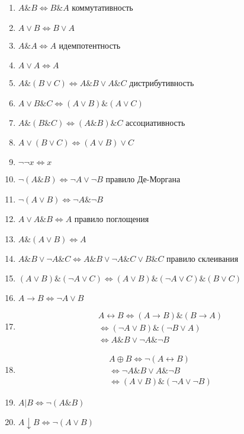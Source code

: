\documentclass[main]{subfiles}
\begin{document}
\begin{enumerate}
    \item $A\& B \Leftrightarrow B\& A$ коммутативность
    \item $A\lor B \Leftrightarrow B\lor A$
    \item $A\& A \Leftrightarrow A$ идемпотентность
    \item $A\lor A \Leftrightarrow  A$
    \item $A\&(B\lor C) \Leftrightarrow  A\& B \lor A\& C$ дистрибутивность
    \item $A\lor B\& C  \Leftrightarrow (A\lor B)\& (A\lor C)$
    \item $A\& (B\&C) \Leftrightarrow (A\& B)\&C$ ассоциативность 
    \item $A\lor (B\lor C) \Leftrightarrow  (A\lor B)\lor C$
    \item $\lnot\lnot x \Leftrightarrow x$
    \item $\lnot(A\&B) \Leftrightarrow \lnot A \lor \lnot B$ правило Де-Моргана
    \item $\lnot(A\lor B) \Leftrightarrow  \lnot A \& \lnot B$
    \item $A\lor A \& B \Leftrightarrow  A$ правило поглощения 
    \item $A\&(A\lor B) \Leftrightarrow  A$
    \item $A\& B \lor \lnot A\& C \Leftrightarrow  A\& B \lor \lnot A \& C \lor B\& C $ правило склеивания
    \item $(A\lor B) \& (\lnot A \lor C) \Leftrightarrow  (A\lor B) \& (\lnot A \lor C) \& (B\lor C)$
    \item $A\to B \Leftrightarrow \lnot A \lor B$
    \item 
        \begin{align*}
        A\leftrightarrow B \Leftrightarrow (A\to B) \& (B\to A)\\
        \Leftrightarrow (\lnot A\lor B) \& (\lnot B \lor A)\\
        \Leftrightarrow A\& B \lor \lnot A \& \lnot B
        \end{align*}
    \item 
        \begin{align*}
            A\oplus B \Leftrightarrow  \lnot(A\leftrightarrow B) \\
            \Leftrightarrow \lnot A\& B \lor A \& \lnot B \\
            \Leftrightarrow (A\lor B) \& (\lnot A \lor \lnot B)
        \end{align*} 
    \item $A|B \Leftrightarrow  \lnot(A\& B)$
    \item $A\downarrow B \Leftrightarrow \lnot (A\lor B)$
\end{enumerate}
\end{document}
